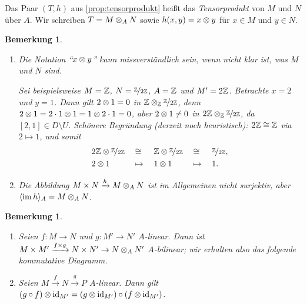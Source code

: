 \documentclass[12pt,a4paper]{scrartcl}
\theoremstyle{cplain}
\theoremstyle{cdef}
\newtheorem{beme}[thmcounter]{Bemerkung}
\begin{document}
\begin{defi}
	Das Paar $(T,h)$ aus \cref{prop:tensorprodukt} heißt das \emph{Tensorprodukt} von $M$ und $N$ über $A$. Wir schreiben $T = M \otimes_A  N$ sowie $h(x,y) = x \otimes y$ für $x \in M$ und $y \in N$.
\end{defi}
\begin{beme}
	\leavevmode
	\begin{enumerate}
		\item Die Notation \enquote{$x \otimes y$} kann missverständlich sein, wenn nicht klar ist, was $M$ und $N$ sind.

		Sei beispielsweise $M=\mathbb Z$, $N= \nicefrac{\mathbb Z}{2\mathbb Z}$, $A = \mathbb Z$ und $M' = 2 \mathbb Z$. Betrachte $x=2$ und $y=1$. Dann gilt $2 \otimes 1 = 0$ in $\mathbb Z \otimes_\mathbb Z \nicefrac{\mathbb Z}{2\mathbb Z}$, denn $2 \otimes 1 = 2 \cdot 1 \otimes 1 = 1 \otimes 2 \cdot 1 = 0$, aber $2 \otimes 1 \neq 0$ in $2\mathbb Z \otimes_\mathbb Z \nicefrac{\mathbb Z}{2 \mathbb Z}$, da $[2,1] \in D \setminus U$. Schönere Begründung (derzeit noch heuristisch): $2\mathbb Z \cong \mathbb Z$ via $2 \mapsto 1$, und somit
		\begin{alignat*}{5}
			&2\mathbb Z \otimes \nicefrac{\mathbb Z}{2\mathbb Z} &&\cong &&\mathbb Z \otimes \nicefrac{\mathbb Z}{2\mathbb Z} &&\cong &&\nicefrac{\mathbb Z}{2\mathbb Z}, \\
			&2 \otimes 1 &&\mapsto\; &&1 \otimes 1 &&\mapsto\; &&1.
		\end{alignat*}
		\item Die Abbildung $M \times N \xrightarrow{h} M \otimes_A N$ ist im Allgemeinen nicht surjektiv, aber $\langle\operatorname{im} h\rangle_A = M \otimes_A N$.
	\end{enumerate}
\end{beme}
\begin{beme}
	\leavevmode
	\begin{enumerate}
		\item Seien $f\colon M \to N$ und $g\colon M' \to N'$ $A$-linear. Dann ist $M \times M' \xrightarrow{f \times g} N \times N' \to N \otimes_A N'$ $A$-bilinear; wir erhalten also das folgende kommutative Diagramm.
		\begin{center}
		\end{center}
		\item Seien $M \xrightarrow{f} N \xrightarrow{g} P$ $A$-linear. Dann gilt $(g \circ f) \otimes \operatorname{id}_{M'} = (g \otimes \operatorname{id}_{M'}) \circ (f \otimes \operatorname{id}_{M'})$.
	\end{enumerate}
\end{beme}
\end{document}
